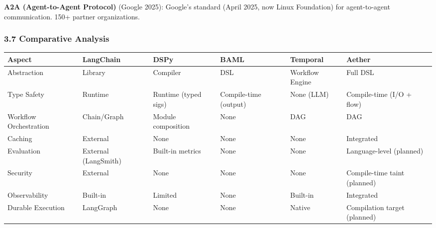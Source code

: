 \documentclass[
]{article}
\newcounter{none} %
\begin{document}
\textbf{A2A (Agent-to-Agent Protocol)} (Google 2025): Google's standard
(April 2025, now Linux Foundation) for agent-to-agent communication.
150+ partner organizations.

\subsubsection{3.7 Comparative Analysis}\label{comparative-analysis}

{\def\LTcaptype{none} %
\begin{longtable}[]{@{}
  >{\raggedright\arraybackslash}p{}
  >{\raggedright\arraybackslash}p{}
  >{\raggedright\arraybackslash}p{}
  >{\raggedright\arraybackslash}p{}
  >{\raggedright\arraybackslash}p{}
  >{\raggedright\arraybackslash}p{}@{}}
\toprule\noalign{}
\begin{minipage}[b]{\linewidth}\raggedright
Aspect
\end{minipage} & \begin{minipage}[b]{\linewidth}\raggedright
LangChain
\end{minipage} & \begin{minipage}[b]{\linewidth}\raggedright
DSPy
\end{minipage} & \begin{minipage}[b]{\linewidth}\raggedright
BAML
\end{minipage} & \begin{minipage}[b]{\linewidth}\raggedright
Temporal
\end{minipage} & \begin{minipage}[b]{\linewidth}\raggedright
Aether
\end{minipage} \\
\midrule\noalign{}
\endhead
\bottomrule\noalign{}
\endlastfoot
Abstraction & Library & Compiler & DSL & Workflow Engine & Full DSL \\
Type Safety & Runtime & Runtime (typed sigs) & Compile-time (output) &
None (LLM) & Compile-time (I/O + flow) \\
Workflow Orchestration & Chain/Graph & Module composition & None & DAG &
DAG \\
Caching & External & None & None & None & Integrated \\
Evaluation & External (LangSmith) & Built-in metrics & None & None &
Language-level (planned) \\
Security & External & None & None & None & Compile-time taint
(planned) \\
Observability & Built-in & Limited & None & Built-in & Integrated \\
Durable Execution & LangGraph & None & None & Native & Compilation
target (planned) \\
\end{longtable}
}
\end{document}
